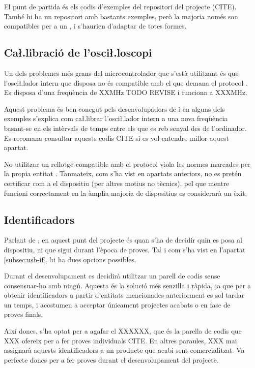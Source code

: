 El punt de partida és els codis d'exemples del repositori del projecte (CITE).
També hi ha un repositori amb bastants exemples, però la majoria només son
compatibles per a un , i s'haurien d'adaptar de totes formes.

\subsection{Ca\l.libració de l'osci\l.loscopi}

Un dels problemes més grans del microcontrolador que s'està utilitzant és que
l'osci\l.lador intern que disposa no és compatible amb el que demana el
protocol . Es disposa d'una freqüència de XXMHz TODO REVISE i
 funciona a XXXMHz.

Aquest problema és ben conegut pels desenvolupadors de  i en alguns
dels exemples s'explica com ca\l.librar l'osci\l.lador intern a una nova
freqüència basant-se en els intèrvals de temps entre els que es reb senyal
des de l'ordinador. Es recomana consultar aquests codis CITE si es vol entendre
millor aquest apartat.

No utilitzar un rellotge compatible amb el protocol  viola les normes
marcades per la propia entitat . Tanmateix, com s'ha vist en
apartats anteriors, no es pretén certificar com a  el dispositiu
(per altres motius no tècnics), pel que mentre funcioni correctament en la
àmplia majoria de dispositius es considerarà un èxit.

\subsection{Identificadors }

Parlant de , en aquest punt del projecte és quan s'ha de decidir
quin  es posa al dispositiu, ni que sigui durant l'època de
proves. Tal i com s'ha vist en l'apartat \ref{subsec:usb-if}, hi ha dues
opcions possibles.

Durant el desenvolupament es decidirà utilitzar un parell de codis sense
consensuar-ho amb ningú. Aquesta és la solució més senzilla i ràpida, ja que per
a obtenir identificadors a partir d'entitats mencionades anteriorment es sol
tardar un temps, i acostumen a acceptar únicament projectes acabats o en fase
de proves finals.

Així doncs, s'ha optat per a agafar el  XXXXXX, que és la parella
de codis que XXX ofereix per a fer proves individuals CITE. En altres paraules,
XXX mai assignarà aquests identificadors a un producte que acabi sent
comercialitzat. Va perfecte doncs per a fer proves durant el desenvolupament del
projecte.

